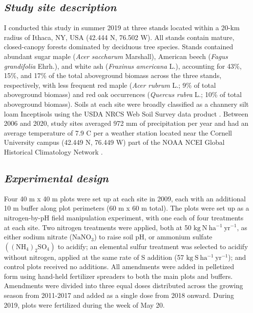 \subsection{\textit{Study site description}}
\noindent I conducted this study in summer 2019 at three stands located within a 20-km radius of Ithaca, NY, USA (42.444 \textdegree{}N, 76.502 \textdegree{}W). All stands contain mature, closed-canopy forests dominated by deciduous tree species. Stands contained abundant sugar maple (\textit{Acer saccharum} Marshall), American beech (\textit{Fagus grandifolia} Ehrh.), and white ash (\textit{Fraxinus americana} L.), accounting for 43\%, 15\%, and 17\% of the total aboveground biomass across the three stands, respectively, with less frequent red maple (\textit{Acer rubrum} L.; 9\% of total aboveground biomass) and red oak occurrences (\textit{Quercus rubra} L.; 10\% of total aboveground biomass). Soils at each site were broadly classified as a channery silt loam Inceptisols using the USDA NRCS Web Soil Survey data product . Between 2006 and 2020, study sites averaged 972 mm of precipitation per year and had an average temperature of 7.9 \textdegree{}C per a weather station located near the Cornell University campus (42.449 \textdegree{}N, 76.449 \textdegree{}W) part of the NOAA NCEI Global Historical Climatology Network .

\subsection{\textit{Experimental design}}
\noindent Four 40 m x 40 m plots were set up at each site in 2009, each with an additional 10 m buffer along plot perimeters (60 m x 60 m total). The plots were set up as a nitrogen-by-pH field manipulation experiment, with one each of four treatments at each site. Two nitrogen treatments were applied, both at 50 $\mathrm{kg\ N\ ha^{-1}\ yr^{-1}}$, as either sodium nitrate ($\mathrm{NaNO_3}$) to raise soil pH, or ammonium sulfate $\mathrm{((NH_4)_{2}SO_4)}$ to acidify; an elemental sulfur treatment was selected to acidify without nitrogen, applied at the same rate of S addition (57 $\mathrm{kg\ S\ ha^{-1}\ yr^{-1}}$); and control plots received no additions. All amendments were added in pelletized form using hand-held fertilizer spreaders to both the main plots and buffers. Amendments were divided into three equal doses distributed across the growing season from 2011-2017 and added as a single dose from 2018 onward. During 2019, plots were fertilized during the week of May 20.

